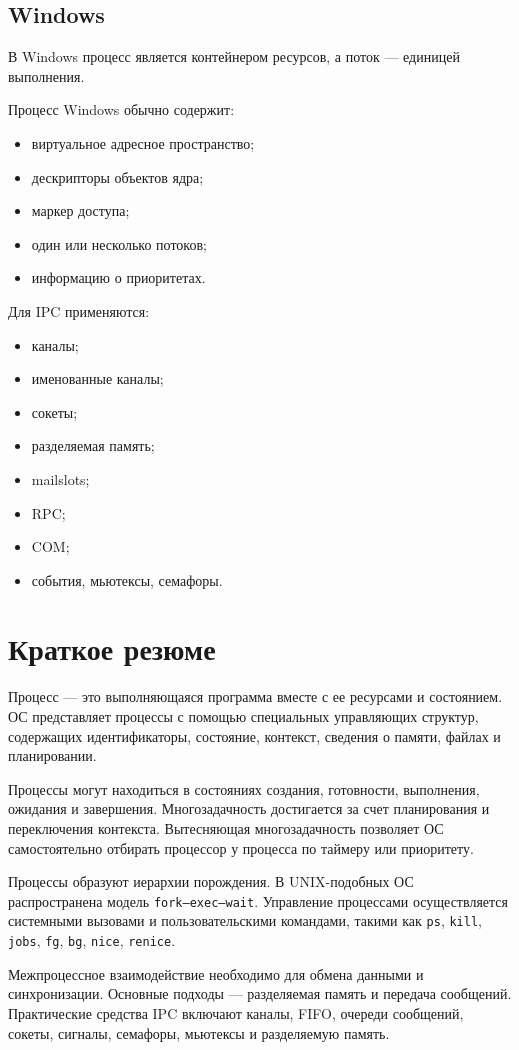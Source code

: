 \documentclass[12pt,a4paper]{article}
\begin{document}
\subsection{Windows}

В Windows процесс является контейнером ресурсов, а поток --- единицей выполнения.

Процесс Windows обычно содержит:
\begin{itemize}
    \item виртуальное адресное пространство;
    \item дескрипторы объектов ядра;
    \item маркер доступа;
    \item один или несколько потоков;
    \item информацию о приоритетах.
\end{itemize}

Для IPC применяются:
\begin{itemize}
    \item каналы;
    \item именованные каналы;
    \item сокеты;
    \item разделяемая память;
    \item mailslots;
    \item RPC;
    \item COM;
    \item события, мьютексы, семафоры.
\end{itemize}

\section{Краткое резюме}

Процесс --- это выполняющаяся программа вместе с ее ресурсами и состоянием. ОС представляет процессы с помощью специальных управляющих структур, содержащих идентификаторы, состояние, контекст, сведения о памяти, файлах и планировании.

Процессы могут находиться в состояниях создания, готовности, выполнения, ожидания и завершения. Многозадачность достигается за счет планирования и переключения контекста. Вытесняющая многозадачность позволяет ОС самостоятельно отбирать процессор у процесса по таймеру или приоритету.

Процессы образуют иерархии порождения. В UNIX-подобных ОС распространена модель \texttt{fork--exec--wait}. Управление процессами осуществляется системными вызовами и пользовательскими командами, такими как \texttt{ps}, \texttt{kill}, \texttt{jobs}, \texttt{fg}, \texttt{bg}, \texttt{nice}, \texttt{renice}.

Межпроцессное взаимодействие необходимо для обмена данными и синхронизации. Основные подходы --- разделяемая память и передача сообщений. Практические средства IPC включают каналы, FIFO, очереди сообщений, сокеты, сигналы, семафоры, мьютексы и разделяемую память.
\end{document}
